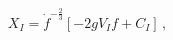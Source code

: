 \begin{equation}
X_I = {\dot f}^{- \frac 23} [-2g V_I f + C_I]\,,
      \label{scalweier}
\end{equation}

